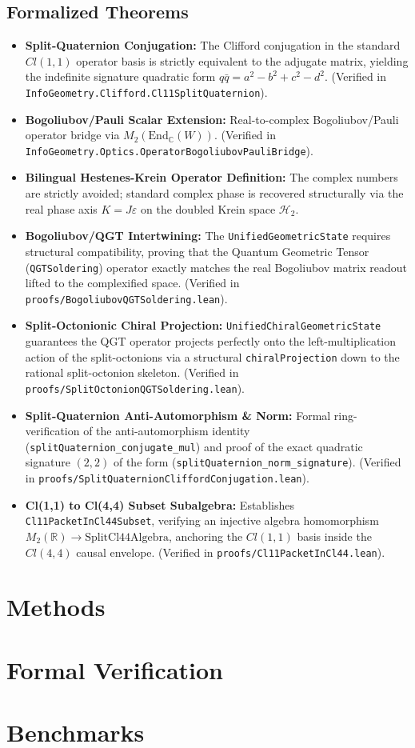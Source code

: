 \documentclass[11pt,a4paper]{article}
\begin{document}
\subsection{Formalized Theorems}
\begin{itemize}
    \item \textbf{Split-Quaternion Conjugation:} The Clifford conjugation in the standard $Cl(1,1)$ operator basis is strictly equivalent to the adjugate matrix, yielding the indefinite signature quadratic form $q \bar{q} = a^2 - b^2 + c^2 - d^2$. (Verified in \texttt{InfoGeometry.Clifford.Cl11SplitQuaternion}).
    \item \textbf{Bogoliubov/Pauli Scalar Extension:} Real-to-complex Bogoliubov/Pauli operator bridge via $M_2(\text{End}_\mathbb{C}(W))$. (Verified in \texttt{InfoGeometry.Optics.OperatorBogoliubovPauliBridge}).
    \item \textbf{Bilingual Hestenes-Krein Operator Definition:} The complex numbers are strictly avoided; standard complex phase is recovered structurally via the real phase axis $K = J\varepsilon$ on the doubled Krein space $\mathcal{H}_2$.
    \item \textbf{Bogoliubov/QGT Intertwining:} The \texttt{UnifiedGeometricState} requires structural compatibility, proving that the Quantum Geometric Tensor (\texttt{QGTSoldering}) operator exactly matches the real Bogoliubov matrix readout lifted to the complexified space. (Verified in \texttt{proofs/BogoliubovQGTSoldering.lean}).
    \item \textbf{Split-Octonionic Chiral Projection:} \texttt{UnifiedChiralGeometricState} guarantees the QGT operator projects perfectly onto the left-multiplication action of the split-octonions via a structural \texttt{chiralProjection} down to the rational split-octonion skeleton. (Verified in \texttt{proofs/SplitOctonionQGTSoldering.lean}).
    \item \textbf{Split-Quaternion Anti-Automorphism \& Norm:} Formal ring-verification of the anti-automorphism identity (\texttt{splitQuaternion\_conjugate\_mul}) and proof of the exact quadratic signature $(2,2)$ of the form (\texttt{splitQuaternion\_norm\_signature}). (Verified in \texttt{proofs/SplitQuaternionCliffordConjugation.lean}).
    \item \textbf{Cl(1,1) to Cl(4,4) Subset Subalgebra:} Establishes \texttt{Cl11PacketInCl44Subset}, verifying an injective algebra homomorphism $M_2(\mathbb{R}) \to \text{SplitCl44Algebra}$, anchoring the $Cl(1,1)$ basis inside the $Cl(4,4)$ causal envelope. (Verified in \texttt{proofs/Cl11PacketInCl44.lean}).
\end{itemize}

\section{Methods}
\label{sec:methods}

\section{Formal Verification}
\label{sec:verification}

\section{Benchmarks}
\label{sec:benchmarks}
\end{document}
